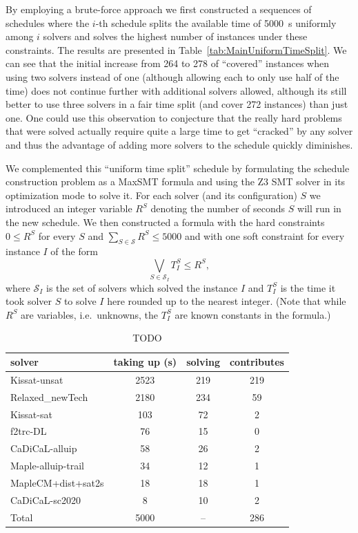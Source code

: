\documentclass{elsarticle}
\begin{document}
By employing a brute-force approach we first constructed a sequences of schedules 
where the $i$-th schedule splits the available time of \SI{5000}{\second} uniformly among
$i$ solvers and solves the highest number of instances under these constraints.
The results are presented in Table~\ref{tab:MainUniformTimeSplit}.
We can see that the initial increase from 264 to 278 of ``covered'' instances 
when using two solvers instead of one (although allowing each to only use half of the time)
does not continue further with additional solvers allowed,
although its still better to use three solvers in a fair time split 
(and cover 272 instances) than just one.
One could use this observation to conjecture that the really hard 
problems that were solved actually require quite a large time to 
get ``cracked'' by any solver and thus the advantage of adding more solvers to the schedule
quickly diminishes.

We complemented this ``uniform time split'' schedule by formulating the schedule construction
problem as a MaxSMT formula and using the Z3 SMT solver \cite{DBLP:conf/tacas/MouraB08} in its optimization mode \cite{DBLP:conf/sycss/BjornerP14} to solve it.
For each solver (and its configuration) $S$ we introduced an integer variable $R^S$ denoting 
the number of seconds $S$ will run in the new schedule. We then constructed a formula with the hard
constraints $0 \leq R^S$ for every $S$ and $\sum_{S\in\mathcal{S}} R^S \leq 5000$ and with one 
soft constraint for every instance $I$ of the form
\[\bigvee_{S \in \mathcal{S}_I} T^S_I \leq R^S,\]
where $\mathcal{S}_I$ is the set of solvers which solved the instance $I$ and $T^S_I$ is the time it took solver $S$ to solve $I$ here rounded up to the nearest integer.
(Note that while $R^S$ are variables, i.e.~unknowns, the $T^S_I$ are known constants in the formula.)

\begin{table}
\caption{TODO}
\label{tab:MainZ3Schedule}
\begin{center}
\begin{tabular}{lccc}
solver & taking up (s) & solving & contributes \\
\hline
Kissat-unsat & 2523 & 219 & 219 \\
Relaxed\_newTech & 2180 & 234 & \phantom{0}59 \\
Kissat-sat & \phantom{0}103 & \phantom{0}72 & \phantom{00}2 \\
f2trc-DL & \phantom{00}76 & \phantom{0}15 & \phantom{00}0 \\
CaDiCaL-alluip & \phantom{00}58 & \phantom{0}26 & \phantom{00}2 \\
Maple-alluip-trail & \phantom{00}34 & \phantom{0}12 & \phantom{00}1 \\
MapleCM+dist+sat2s & \phantom{00}18 & \phantom{0}18 & \phantom{00}1 \\
CaDiCaL-sc2020 & \phantom{000}8 & \phantom{0}10 & \phantom{00}2 \\
\hline 
Total & 5000 & \phantom{0}-- & 286 \\ 
\end{tabular}
\end{center}
\end{table}
\end{document}
